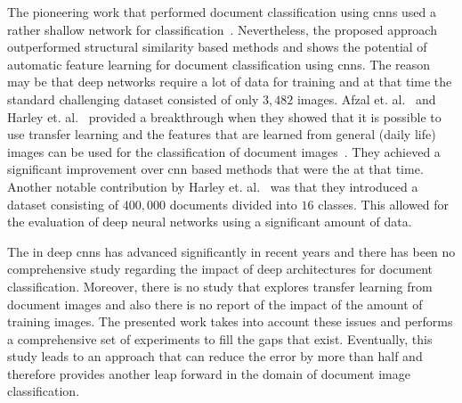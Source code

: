 

The pioneering work that performed document classification using \ac{cnn}s used a rather shallow network for classification~\cite{lekang_14_a}. Nevertheless, the proposed approach outperformed structural similarity based methods and shows the potential of automatic feature learning for document classification using \ac{cnn}s. The reason may be that deep networks require a lot of data for training and at that time the standard challenging dataset consisted of only $3,482$ images.
Afzal et. al.~\cite{afzal2015deepdocclassifier} and Harley et. al.~\cite{harley2015evaluation} provided a breakthrough when they showed that it is possible to use transfer learning and the features that are learned from general (daily life) images can be used for the classification of document images~\cite{afzal2015deepdocclassifier}. They achieved a significant improvement over \ac{cnn} based methods that were the \sota at that time.
Another notable contribution by Harley et. al.~\cite{harley2015evaluation} was that they introduced a dataset consisting of $400,000$ documents divided into $16$ classes.
This allowed for the evaluation of deep neural networks using a significant amount of data. 

The \sota in deep \ac{cnn}s has advanced significantly in recent years and there has been no comprehensive study regarding the impact of deep architectures for document classification. Moreover, there is no study that explores transfer learning from document images and also there is no report of the impact of the amount of training images. The presented work takes into account these issues and performs a comprehensive set of experiments to fill the gaps that exist. Eventually, this study leads to an approach that can reduce the error by more than half and therefore provides another leap forward in the domain of document image classification.


